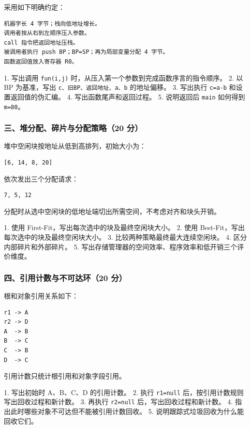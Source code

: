 \documentclass[UTF8]{ctexart}
\begin{document}
采用如下明确约定：

\begin{Verbatim}[fontsize=\small,breaklines=true]
机器字长 4 字节；栈向低地址增长。
调用者按从右到左顺序压入参数。
call 指令把返回地址压栈。
被调用者执行 push BP；BP=SP；再为局部变量分配 4 字节。
函数返回值放入寄存器 R0。
\end{Verbatim}

1. 写出调用 \texttt{fun(i,j)} 时，从压入第一个参数到完成函数序言的指令顺序。 2. 以 BP 为基准，写出 \texttt{c、旧BP、返回地址、a、b} 的地址偏移。 3. 写出执行 \texttt{c=a-b} 和设置返回值的伪汇编。 4. 写出函数尾声和返回过程。 5. 说明返回后 \texttt{main} 如何得到 \texttt{m=80}。

\subsubsection*{三、堆分配、碎片与分配策略（20 分）}

堆中空闲块按地址从低到高排列，初始大小为：

\begin{Verbatim}[fontsize=\small,breaklines=true]
[6, 14, 8, 20]
\end{Verbatim}

依次发出三个分配请求：

\begin{Verbatim}[fontsize=\small,breaklines=true]
7, 5, 12
\end{Verbatim}

分配时从选中空闲块的低地址端切出所需空间，不考虑对齐和块头开销。

1. 使用 First-Fit，写出每次选中的块及最终空闲块大小。 2. 使用 Best-Fit，写出每次选中的块及最终空闲块大小。 3. 比较两种策略最终最大连续空闲块。 4. 区分内部碎片和外部碎片。 5. 写出存储管理器的空间效率、程序效率和低开销三个评价维度。

\subsubsection*{四、引用计数与不可达环（20 分）}

根和对象引用关系如下：

\begin{Verbatim}[fontsize=\small,breaklines=true]
r1 -> A
r2 -> D
A  -> B
B  -> C
C  -> B
D  -> C
\end{Verbatim}

引用计数只统计根引用和对象字段引用。

1. 写出初始时 A、B、C、D 的引用计数。 2. 执行 \texttt{r1=null} 后，按引用计数规则写出回收过程和新计数。 3. 再执行 \texttt{r2=null} 后，写出回收过程和新计数。 4. 指出此时哪些对象不可达但不能被引用计数回收。 5. 说明跟踪式垃圾回收为什么能回收它们。
\end{document}
